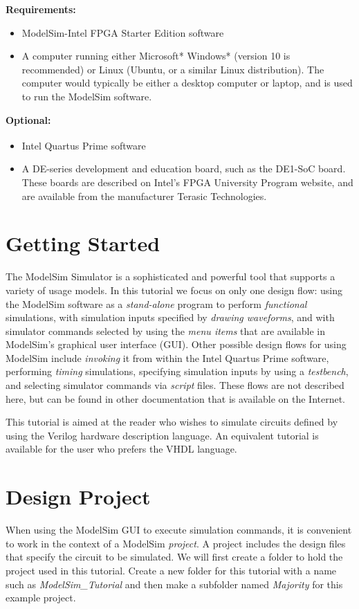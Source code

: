 \documentclass[11pt, twoside, pdftex]{article}
\begin{document}
{\bf Requirements:}
\begin{itemize}
\item ModelSim-Intel FPGA Starter Edition software
\item A computer running either Microsoft* Windows* (version 10 is recommended) or Linux 
(Ubuntu, or a similar Linux distribution). The computer would typically be either a
desktop computer or laptop, and is used to run the ModelSim software.
\end{itemize}

{\bf Optional:}
\begin{itemize}
\item Intel Quartus\textsuperscript{\textregistered} Prime software
\item A DE-series development and education board, such as the DE1-SoC board. These boards are 
described on Intel's FPGA University Program website, and are available from the manufacturer 
Terasic Technologies.
\end{itemize}
\clearpage
\newpage
\section{Getting Started}

The ModelSim Simulator is a sophisticated and powerful tool that supports a variety of 
usage models. In this tutorial we focus on only one design flow: using the ModelSim
software as a {\it stand-alone} program to perform {\it functional} simulations, with 
simulation inputs specified by {\it drawing waveforms}, and with simulator commands selected 
by using the {\it menu items} that are available in ModelSim's graphical user interface
(GUI).  Other possible design flows for using ModelSim include {\it invoking} it from within the 
Intel Quartus Prime software, performing {\it timing} simulations, specifying simulation 
inputs by using a {\it testbench}, and selecting simulator commands via {\it script} files.
These flows are not described here, but can be found in other
documentation that is available on the Internet.  

This tutorial is aimed at the reader who wishes to simulate circuits defined
by using the Verilog hardware description language. An equivalent tutorial is
available for the user who prefers the VHDL language.
 
\section{Design Project}
When using the ModelSim GUI to execute simulation commands, it is convenient to work in the
context of a ModelSim {\it project}. A project includes the design files that specify the 
circuit to be simulated. We will first create a folder to hold the project used 
in this tutorial.  Create a new folder for this tutorial with a name such as
{\it ModelSim\_Tutorial} and then make a subfolder named {\it Majority} for this 
example project.
\end{document}
